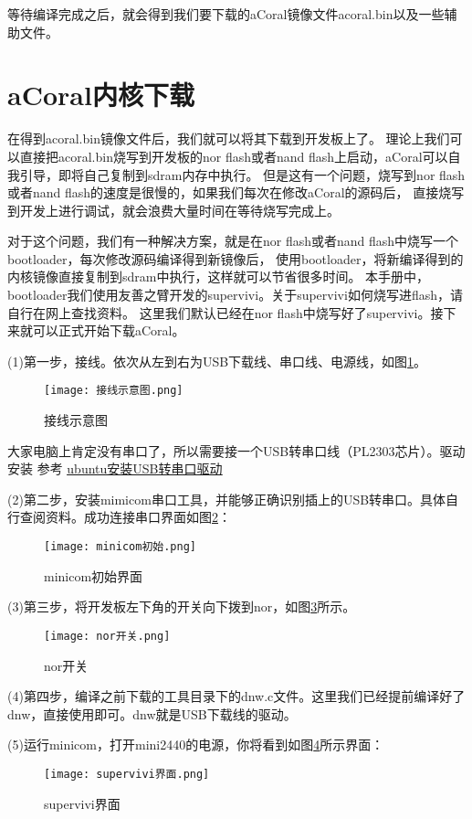 等待编译完成之后，就会得到我们要下载的aCoral镜像文件acoral.bin以及一些辅助文件。

\section{aCoral内核下载}

在得到acoral.bin镜像文件后，我们就可以将其下载到开发板上了。
理论上我们可以直接把acoral.bin烧写到开发板的nor flash或者nand flash上启动，aCoral可以自我引导，即将自己复制到sdram内存中执行。
但是这有一个问题，烧写到nor flash或者nand flash的速度是很慢的，如果我们每次在修改aCoral的源码后，
直接烧写到开发上进行调试，就会浪费大量时间在等待烧写完成上。

对于这个问题，我们有一种解决方案，就是在nor flash或者nand flash中烧写一个bootloader，每次修改源码编译得到新镜像后，
使用bootloader，将新编译得到的内核镜像直接复制到sdram中执行，这样就可以节省很多时间。
本手册中，bootloader我们使用友善之臂开发的supervivi。关于supervivi如何烧写进flash，请自行在网上查找资料。
这里我们默认已经在nor flash中烧写好了supervivi。接下来就可以正式开始下载aCoral。

(1)第一步，接线。依次从左到右为USB下载线、串口线、电源线，如图\ref{接线示意图}。
\begin{figure}[H]
	\texttt{[image: 接线示意图.png]}
	\caption{接线示意图}
	\label{接线示意图}
\end{figure}

大家电脑上肯定没有串口了，所以需要接一个USB转串口线（PL2303芯片）。驱动安装
参考 \href{https://blog.csdn.net/qq_34562093/article/details/75059251}{\underline{ubuntu安装USB转串口驱动}}

(2)第二步，安装mimicom串口工具，并能够正确识别插上的USB转串口。具体自行查阅资料。成功连接串口界面如图\ref{minicom初始}：
\begin{figure}[H]
	\texttt{[image: minicom初始.png]}
	\caption{minicom初始界面}
	\label{minicom初始}
\end{figure}

(3)第三步，将开发板左下角的开关向下拨到nor，如图\ref{nor开关}所示。
\begin{figure}[H]
	\texttt{[image: nor开关.png]}
	\caption{nor开关}
	\label{nor开关}
\end{figure}

(4)第四步，编译之前下载的工具目录下的dnw.c文件。这里我们已经提前编译好了dnw，直接使用即可。dnw就是USB下载线的驱动。

(5)运行minicom，打开mini2440的电源，你将看到如图\ref{supervivi界面}所示界面：
\begin{figure}[H]
	\texttt{[image: supervivi界面.png]}
	\caption{supervivi界面}
	\label{supervivi界面}
\end{figure}

